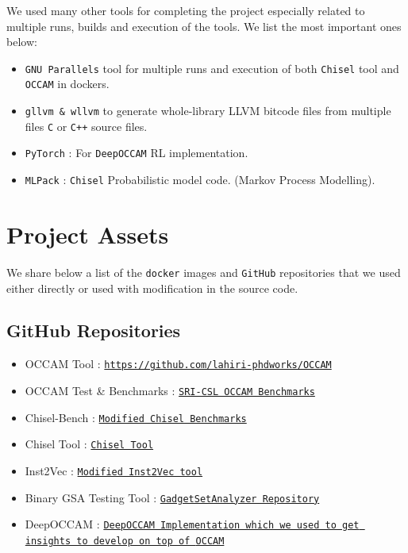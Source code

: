 \documentclass{relatorio}
\begin{document}
We used many other tools for completing the project especially related to multiple runs, builds and execution of the tools. We list the most important ones below:

\begin{itemize}
	\item \texttt{GNU Parallels} tool for multiple runs and execution of both \texttt{Chisel} tool and \texttt{OCCAM} in dockers.
	\item \texttt{gllvm \& wllvm} to generate whole-library LLVM bitcode files from multiple files \texttt{C} or \texttt{C++} source files. 
	\item \texttt{PyTorch} : For \texttt{DeepOCCAM} RL implementation.
	\item \texttt{MLPack} : \texttt{Chisel} Probabilistic model code. (Markov Process Modelling).
\end{itemize}


\section{Project Assets}%

We share below a list of the \texttt{docker} images and \texttt{GitHub} repositories that we used either directly or used with modification in the source code. 

\subsection{GitHub Repositories}%

\begin{itemize}
	\item OCCAM Tool : \texttt{\href{https://github.com/lahiri-phdworks/OCCAM} {https://github.com/lahiri-phdworks/OCCAM}}
	\item OCCAM Test \& Benchmarks : \texttt{\href{https://github.com/lahiri-phdworks/OCCAM-Benchmarks} {SRI-CSL OCCAM Benchmarks}}
	\item Chisel-Bench : \texttt{\href{https://github.com/lahiri-phdworks/chisel-bench} {Modified Chisel Benchmarks}}
	\item Chisel Tool : \texttt{\href{https://github.com/lahiri-phdworks/chisel} {Chisel Tool}}
	\item Inst2Vec : \texttt{\href{https://github.com/lahiri-phdworks/ncc} {Modified Inst2Vec tool}}
	\item Binary GSA Testing Tool : \texttt{\href{https://github.com/michaelbrownuc/GadgetSetAnalyzer} {GadgetSetAnalyzer Repository}}
	\item DeepOCCAM : \texttt{\href{https://github.com/nhamlv-55/OCCAM/tree/mlpolicy} {DeepOCCAM Implementation which we used to get insights to develop on top of \texttt{OCCAM}}}
\end{itemize}
\end{document}
